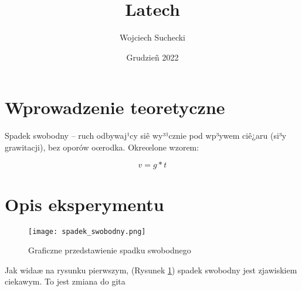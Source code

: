 \documentclass{article}
\title{Latech}
\author{Wojciech Suchecki}
\date{Grudzieñ 2022}
\begin{document}
\maketitle

\section{Wprowadzenie teoretyczne}
Spadek swobodny – ruch odbywaj¹cy siê wy³¹cznie pod wp³ywem ciê¿aru (si³y grawitacji), bez oporów oœrodka. Okreœlone wzorem:

\begin{equation}
    v = g * t
\end{equation}

\section{Opis eksperymentu}
\begin{figure}[ht]
\begin{center}
    \texttt{[image: spadek\_swobodny.png]}
    \caption{Graficzne przedstawienie spadku swobodnego}
    \label{Spadek}
\end{center}
\end{figure}

Jak widaæ na rysunku pierwszym, (Rysunek \ref{Spadek}) spadek swobodny jest zjawiskiem ciekawym. To jest zmiana do gita
\end{document}
